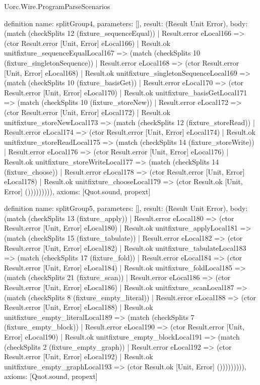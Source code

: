 \begin{lexlean}{Uorc.Wire.ProgramParseScenarios}
\begin{semanticmodule}
definition{
  name: splitGroup4,
  parameters: [],
  result: (Result Unit Error),
  body: (match (checkSplits 12 (fixture_sequenceEqual))
    | Result.error eLocal166 => (ctor Result.error [Unit, Error] eLocal166)
    | Result.ok unitfixture_sequenceEqualLocal167 => (match (checkSplits 10 (fixture_singletonSequence))
      | Result.error eLocal168 => (ctor Result.error [Unit, Error] eLocal168)
      | Result.ok unitfixture_singletonSequenceLocal169 => (match (checkSplits 10 (fixture_basisGet))
        | Result.error eLocal170 => (ctor Result.error [Unit, Error] eLocal170)
        | Result.ok unitfixture_basisGetLocal171 => (match (checkSplits 10 (fixture_storeNew))
          | Result.error eLocal172 => (ctor Result.error [Unit, Error] eLocal172)
          | Result.ok unitfixture_storeNewLocal173 => (match (checkSplits 12 (fixture_storeRead))
            | Result.error eLocal174 => (ctor Result.error [Unit, Error] eLocal174)
            | Result.ok unitfixture_storeReadLocal175 => (match (checkSplits 14 (fixture_storeWrite))
              | Result.error eLocal176 => (ctor Result.error [Unit, Error] eLocal176)
              | Result.ok unitfixture_storeWriteLocal177 => (match (checkSplits 14 (fixture_choose))
                | Result.error eLocal178 => (ctor Result.error [Unit, Error] eLocal178)
                | Result.ok unitfixture_chooseLocal179 => (ctor Result.ok [Unit, Error] ())))))))),
  axioms: [Quot.sound, propext]
}

definition{
  name: splitGroup5,
  parameters: [],
  result: (Result Unit Error),
  body: (match (checkSplits 13 (fixture_apply))
    | Result.error eLocal180 => (ctor Result.error [Unit, Error] eLocal180)
    | Result.ok unitfixture_applyLocal181 => (match (checkSplits 15 (fixture_tabulate))
      | Result.error eLocal182 => (ctor Result.error [Unit, Error] eLocal182)
      | Result.ok unitfixture_tabulateLocal183 => (match (checkSplits 17 (fixture_fold))
        | Result.error eLocal184 => (ctor Result.error [Unit, Error] eLocal184)
        | Result.ok unitfixture_foldLocal185 => (match (checkSplits 21 (fixture_scan))
          | Result.error eLocal186 => (ctor Result.error [Unit, Error] eLocal186)
          | Result.ok unitfixture_scanLocal187 => (match (checkSplits 8 (fixture_empty_literal))
            | Result.error eLocal188 => (ctor Result.error [Unit, Error] eLocal188)
            | Result.ok unitfixture_empty_literalLocal189 => (match (checkSplits 7 (fixture_empty_block))
              | Result.error eLocal190 => (ctor Result.error [Unit, Error] eLocal190)
              | Result.ok unitfixture_empty_blockLocal191 => (match (checkSplits 2 (fixture_empty_graph))
                | Result.error eLocal192 => (ctor Result.error [Unit, Error] eLocal192)
                | Result.ok unitfixture_empty_graphLocal193 => (ctor Result.ok [Unit, Error] ())))))))),
  axioms: [Quot.sound, propext]
}


\end{semanticmodule}
\end{lexlean}
